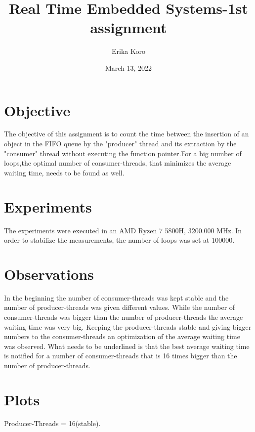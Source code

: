 \documentclass[12pt, a4paper, twoside]{report}
\title{Real Time Embedded Systems-1st assignment}
\author{Erika Koro}
\date{March 13, 2022}
\begin{document}
    \maketitle

    \newpage 
    \section*{Objective}

    The objective of this assignment is to count the time between the insertion of an object
    in the FIFO queue by the "producer" thread and its extraction by the "consumer" thread without
    executing the function pointer.For a big number of loops,the optimal number of consumer-threads,
    that minimizes the average waiting time, needs to be found as well.

    \section*{Experiments}
    
    The experiments were executed in an AMD Ryzen 7 5800H, 3200.000 MHz. 
    In order to stabilize the measurements, the number of loops was set at 100000.


    \section*{Observations}

    In the beginning the number of consumer-threads was kept stable and the number of producer-threads
    was given different values. While the number of consumer-threads was bigger than the number of producer-threads
    the average waiting time was very big. Keeping the producer-threads stable and giving bigger numbers
    to the consumer-threads an optimization of the average waiting time was observed. What needs to be
    underlined is that the best average waiting time is notified for a number of consumer-threads that is
    16 times bigger than the number of producer-threads.   

    \newpage
    \section*{Plots}

    Producer-Threads = 16(stable).
\end{document}
